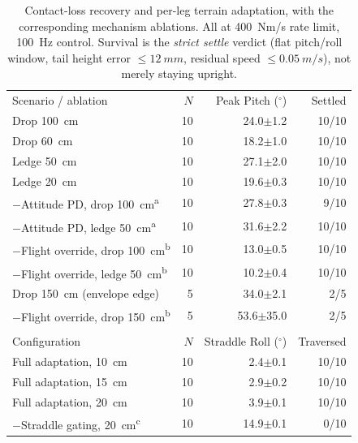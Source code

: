 \documentclass[conference]{IEEEtran}
\begin{document}
\begin{table}[t]
\centering
\caption{Contact-loss recovery and per-leg terrain adaptation, with the
corresponding mechanism ablations. All at \SI{400}{Nm/s} rate limit,
\SI{100}{Hz} control. Survival is the \emph{strict settle} verdict (flat
pitch/roll window, tail height error ${\leq}\SI{12}{mm}$, residual speed
${\leq}\SI{0.05}{m/s}$), not merely staying upright.}
\label{tab:flight_ext}
\footnotesize
\setlength{\tabcolsep}{4pt}
\begin{tabular}{@{}>{\raggedright\arraybackslash}p{3.5cm}rrr@{}}
\toprule
\multicolumn{4}{c}{\textbf{Contact-Loss Recovery}} \\
\midrule
Scenario / ablation & $N$ & Peak Pitch ($^\circ$) & Settled \\
\midrule
Drop \SI{100}{cm}    & 10 & 24.0$\pm$1.2 & 10/10 \\
Drop \SI{60}{cm}     & 10 & 18.2$\pm$1.0 & 10/10 \\
Ledge \SI{50}{cm}    & 10 & 27.1$\pm$2.0 & 10/10 \\
Ledge \SI{20}{cm}    & 10 & 19.6$\pm$0.3 & 10/10 \\
\addlinespace[1pt]
$-$Attitude PD, drop \SI{100}{cm}\textsuperscript{a}   & 10 & 27.8$\pm$0.3 & 9/10 \\
$-$Attitude PD, ledge \SI{50}{cm}\textsuperscript{a}   & 10 & 31.6$\pm$2.2 & 10/10 \\
$-$Flight override, drop \SI{100}{cm}\textsuperscript{b} & 10 & 13.0$\pm$0.5 & 10/10 \\
$-$Flight override, ledge \SI{50}{cm}\textsuperscript{b} & 10 & 10.2$\pm$0.4 & 10/10 \\
\addlinespace[1pt]
Drop \SI{150}{cm} (envelope edge)      & 5 & 34.0$\pm$2.1 & 2/5 \\
$-$Flight override, drop \SI{150}{cm}\textsuperscript{b} & 5 & 53.6$\pm$35.0 & 2/5 \\
\midrule
\multicolumn{4}{c}{\textbf{Per-Leg Terrain (One-Wheel Curb, \SI{0.15}{m/s})}} \\
\midrule
Configuration & $N$ & Straddle Roll ($^\circ$) & Traversed \\
\midrule
Full adaptation, \SI{10}{cm}  & 10 & 2.4$\pm$0.1 & 10/10 \\
Full adaptation, \SI{15}{cm}  & 10 & 2.9$\pm$0.2 & 10/10 \\
Full adaptation, \SI{20}{cm}  & 10 & 3.9$\pm$0.1 & 10/10 \\
\addlinespace[1pt]
$-$Straddle gating, \SI{20}{cm}\textsuperscript{c} & 10 & 14.9$\pm$0.1 & 0/10 \\

\end{tabular}
\end{table}
\end{document}
